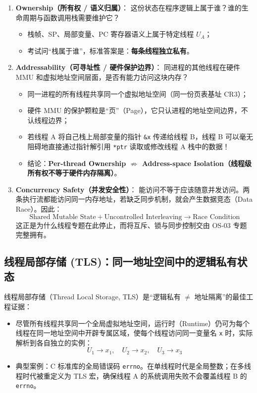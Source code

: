 \documentclass[11pt,a4paper]{ctexart}
\newcommand{\kw}[1]{\textbf{#1}}
\newcommand{\code}[1]{\texttt{#1}}
\begin{document}
\begin{enumerate}
\item \kw{Ownership（所有权 / 语义归属）}：
  这份状态在程序逻辑上属于谁？谁的生命周期与函数调用栈需要维护它？
  \begin{itemize}
    \item 栈帧、SP、局部变量、PC 寄存器语义上属于特定线程 $U_A$；
    \item 考试问“栈属于谁”，标准答案是：\kw{每条线程独立私有}。
  \end{itemize}

\item \kw{Addressability（可寻址性 / 硬件保护边界）}：
  同进程的其他线程在硬件 MMU 和虚拟地址空间层面，是否有能力访问这块内存？
  \begin{itemize}
    \item 同一进程的所有线程共享同一个虚拟地址空间（同一份页表基址 CR3）；
    \item 硬件 MMU 的保护颗粒是“页”（Page），它只认进程的地址空间边界，不认线程边界；
    \item 若线程 A 将自己栈上局部变量的指针 \code{\&x} 传递给线程 B，线程 B 可以毫无阻碍地直接通过指针解引用 \code{*ptr} 读取或修改线程 A 栈中的数据！
    \item 结论：\kw{Per-thread Ownership $\not\Rightarrow$ Address-space Isolation（线程级所有权不等于硬件内存隔离）}。
  \end{itemize}

\item \kw{Concurrency Safety（并发安全性）}：
  能访问不等于应该随意并发访问。两条执行流都能访问同一内存地址，若缺乏同步机制，就会产生数据竞态（Data Race）。因此：
  \[
  \boxed{\text{Shared Mutable State} + \text{Uncontrolled Interleaving} \longrightarrow \text{Race Condition}}
  \]
  这正是为什么线程专题在此停止，而将互斥、锁与同步控制交由 OS-03 专题完整拥有。
\end{enumerate}

\subsection{线程局部存储 (TLS)：同一地址空间中的逻辑私有状态}

线程局部存储（Thread Local Storage, TLS）是“逻辑私有 $\neq$ 地址隔离”的最佳工程证据：
\begin{itemize}
\item 尽管所有线程共享同一个全局虚拟地址空间，运行时（Runtime）仍可为每个线程在同一地址空间中开辟专属区域，使每个线程访问同一变量名 \code{x} 时，实际解析到各自独立的实例：
  \[
  U_1 \to x_1,\quad U_2 \to x_2,\quad U_3 \to x_3
  \]
\item 典型案例：C 标准库的全局错误码 \code{errno}。在单线程时代是全局整数；在多线程时代被重定义为 TLS 宏，确保线程 A 的系统调用失败不会覆盖线程 B 的 \code{errno}。
\end{itemize}
\end{document}
